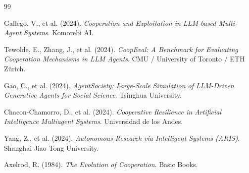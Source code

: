 \documentclass[12pt, a4paper]{article}
\begin{document}


\begin{thebibliography}{99}

Gallego, V., et al. (2024).
\textit{Cooperation and Exploitation in LLM-based Multi-Agent Systems}.
Komorebi AI.

Tewolde, E., Zhang, J., et al. (2024).
\textit{CoopEval: A Benchmark for Evaluating Cooperation Mechanisms in LLM Agents}.
CMU / University of Toronto / ETH Zürich.

Gao, C., et al. (2024).
\textit{AgentSociety: Large-Scale Simulation of LLM-Driven Generative Agents for Social Science}.
Tsinghua University.

Chacon-Chamorro, D., et al. (2024).
\textit{Cooperative Resilience in Artificial Intelligence Multiagent Systems}.
Universidad de los Andes.

Yang, Z., et al. (2024).
\textit{Autonomous Research via Intelligent Systems (ARIS)}.
Shanghai Jiao Tong University.

Axelrod, R. (1984).
\textit{The Evolution of Cooperation}.
Basic Books.

\end{thebibliography}
\end{document}

